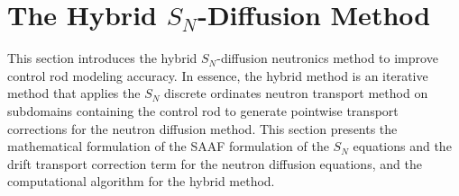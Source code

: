 \section{The Hybrid $S_N$-Diffusion Method} \label{sec:hybrid}

This section introduces the hybrid $S_N$-diffusion neutronics method to improve control rod
modeling accuracy. In essence, the hybrid method is an iterative method that applies
the $S_N$ discrete ordinates neutron transport method on subdomains containing the control rod to
generate pointwise transport corrections for the neutron diffusion method.
This section presents the mathematical formulation of the
\gls{SAAF} formulation of the $S_N$ equations and the drift transport correction term for the
neutron diffusion equations, and the computational algorithm for the hybrid method.


